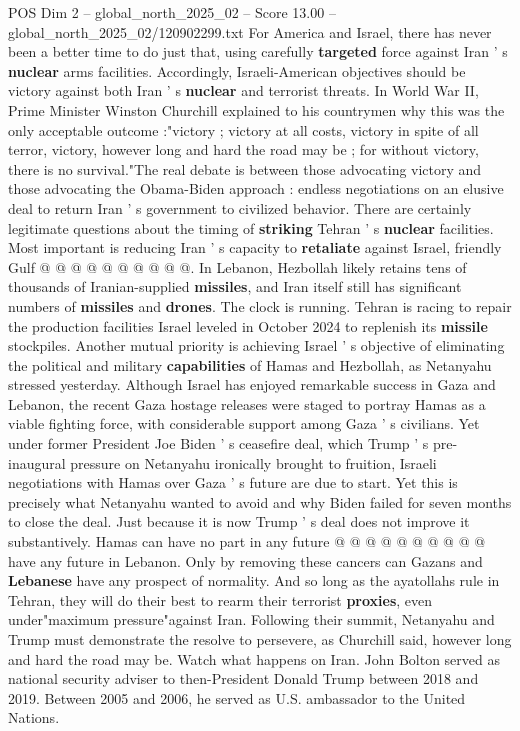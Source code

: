 \begin{textsample}{POS Dim 2 – global\_north\_2025\_02 – Score 13.00 – global\_north\_2025\_02/120902299.txt}
For America and Israel, there has never been a better time to do just that, using carefully \textbf{targeted} force against Iran ' s \textbf{nuclear} arms facilities.
Accordingly, Israeli-American objectives should be victory against both Iran ' s \textbf{nuclear} and terrorist threats.
In World War II, Prime Minister Winston Churchill explained to his countrymen why this was the only acceptable outcome :"victory ; victory at all costs, victory in spite of all terror, victory, however long and hard the road may be ; for without victory, there is no survival."The real debate is between those advocating victory and those advocating the Obama-Biden approach : endless negotiations on an elusive deal to return Iran ' s government to civilized behavior.
There are certainly legitimate questions about the timing of \textbf{striking} Tehran ' s \textbf{nuclear} facilities.
Most important is reducing Iran ' s capacity to \textbf{retaliate} against Israel, friendly Gulf @ @ @ @ @ @ @ @ @ @.
In Lebanon, Hezbollah likely retains tens of thousands of Iranian-supplied \textbf{missiles}, and Iran itself still has significant numbers of \textbf{missiles} and \textbf{drones}.
The clock is running.
Tehran is racing to repair the production facilities Israel leveled in October 2024 to replenish its \textbf{missile} stockpiles.
Another mutual priority is achieving Israel ' s objective of eliminating the political and military \textbf{capabilities} of Hamas and Hezbollah, as Netanyahu stressed yesterday.
Although Israel has enjoyed remarkable success in Gaza and Lebanon, the recent Gaza hostage releases were staged to portray Hamas as a viable fighting force, with considerable support among Gaza ' s civilians.
Yet under former President Joe Biden ' s ceasefire deal, which Trump ' s pre-inaugural pressure on Netanyahu ironically brought to fruition, Israeli negotiations with Hamas over Gaza ' s future are due to start.
Yet this is precisely what Netanyahu wanted to avoid and why Biden failed for seven months to close the deal.
Just because it is now Trump ' s deal does not improve it substantively.
Hamas can have no part in any future @ @ @ @ @ @ @ @ @ @ have any future in Lebanon.
Only by removing these cancers can Gazans and \textbf{Lebanese} have any prospect of normality.
And so long as the ayatollahs rule in Tehran, they will do their best to rearm their terrorist \textbf{proxies}, even under"maximum pressure"against Iran.
Following their summit, Netanyahu and Trump must demonstrate the resolve to persevere, as Churchill said, however long and hard the road may be.
Watch what happens on Iran.
John Bolton served as national security adviser to then-President Donald Trump between 2018 and 2019.
Between 2005 and 2006, he served as U.S. ambassador to the United Nations.

\end{textsample}
